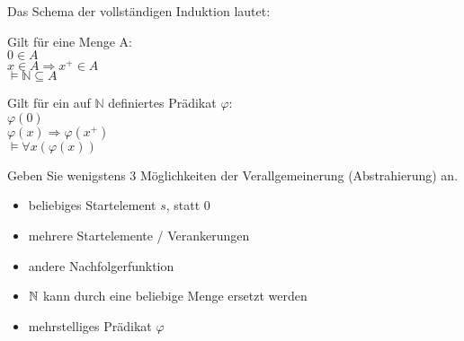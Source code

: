 \begin{card}
	Das Schema der vollständigen Induktion lautet:\\
  \begin{minipage}[t]{0.48\textwidth}
    Gilt für eine Menge A:\\
    $0 \in A$\\
    $x \in A \Rightarrow x^+ \in A$\\
    $\vDash \mathbb{N} \subseteq A$\\
	\end{minipage}
  \begin{minipage}[t]{0.48\textwidth}
    Gilt für ein auf $\mathbb{N}$ definiertes Prädikat $\varphi$:\\
    $\varphi(0)$\\
    $\varphi(x) \Rightarrow \varphi(x^+)$\\
    $\vDash \forall x (\varphi(x))$\\
	\end{minipage}
	Geben Sie wenigstens 3 Möglichkeiten der Verallgemeinerung (Abstrahierung) an.
	\hr
	\begin{itemize}
    \item beliebiges Startelement $s$, statt 0
    \item mehrere Startelemente / Verankerungen
    \item andere Nachfolgerfunktion
    \item $\mathbb{N}$ kann durch eine beliebige Menge ersetzt werden
    \item mehrstelliges Prädikat $\varphi$
	\end{itemize}
\end{card}
